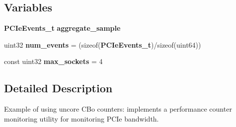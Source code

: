 \subsection*{Variables}
\begin{DoxyCompactItemize}
\item 
{\bf P\+C\+Ie\+Events\+\_\+t} {\bfseries aggregate\+\_\+sample}\label{pcm-pcie_8cpp_a8d06403fc15f27838a1ddb92d5413497}

\item 
uint32 {\bfseries num\+\_\+events} = (sizeof({\bf P\+C\+Ie\+Events\+\_\+t})/sizeof(uint64))\label{pcm-pcie_8cpp_a9ac6c39dd8f3e56144ef3c7259aa402a}

\item 
const uint32 {\bfseries max\+\_\+sockets} = 4\label{pcm-pcie_8cpp_a7ef99323bd02eadd1f92faf654a892be}

\end{DoxyCompactItemize}


\subsection{Detailed Description}
Example of using uncore C\+Bo counters\+: implements a performance counter monitoring utility for monitoring P\+C\+Ie bandwidth. 

